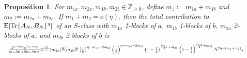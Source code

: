 \documentclass[11pt,reqno]{amsart}
\numberwithin{equation}{section}
\newtheorem{prop}[thm]{Proposition}
\theoremstyle{plain}
\newcommand{\E}[1]{\mathbb{E}[#1]}
\begin{document}
\begin{prop}\label{j,k-checkerboard trace}
For $m_{1a}, m_{2a}, m_{1b}, m_{2b}\in \mathbb{Z}_{\geq 0}$, define $m_1:=m_{1a}+m_{1b}$ and $m_2:=m_{2a}+m_{2b}$. If $m_1+m_2=o(\eta)$, then the total contribution to $\E{\textup{Tr}\{A_N, B_N\}^\eta}$ of an $S$-class with $m_{1a}$ 1-blocks of $a$, $m_{1b}$ 1-blocks of $b$, $m_{2a}$ 2-blocks of $a$, and $m_{2b}$ 2-blocks of $b$ is 
\begin{equation*}
\resizebox{1.0\hsize}{!}{$\frac{2^{\eta-2m_2}\eta^{m_1+m_2}}{m_{1a}!m_{1b}!m_{2a}!m_{2b}!}2^{\frac{m_1}{2}}(m_{1a})!!(m_{1b})!!\left(\frac{1}{k}\right)^{\eta-m_{1a}-2m_{2a}}\left(\frac{1}{j}\right)^{\eta-m_{1b}-2m_{2b}}\left(1-\frac{1}{k}\right)^{\frac{m_{1a}}{2}+m_{2a}}\left(1-\frac{1}{j}\right)^{\frac{m_{1b}}{2}+m_{2b}}N^{2\eta-(m_1+m_2)}$}.
\end{equation*} 
\end{prop}
\end{document}
